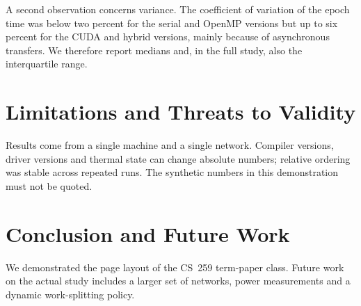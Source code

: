 \documentclass[siunitx]{cs259}
\begin{document}
A second observation concerns variance. The coefficient of variation of the
epoch time was below two percent for the serial and OpenMP versions but up to
six percent for the CUDA and hybrid versions, mainly because of asynchronous
transfers. We therefore report medians and, in the full study, also the
interquartile range.

\section{Limitations and Threats to Validity}
Results come from a single machine and a single network. Compiler versions,
driver versions and thermal state can change absolute numbers; relative
ordering was stable across repeated runs. The synthetic numbers in this
demonstration must not be quoted.

\section{Conclusion and Future Work}
We demonstrated the page layout of the CS~259 term-paper class. Future work
on the actual study includes a larger set of networks, power measurements and
a dynamic work-splitting policy.



\end{document}
